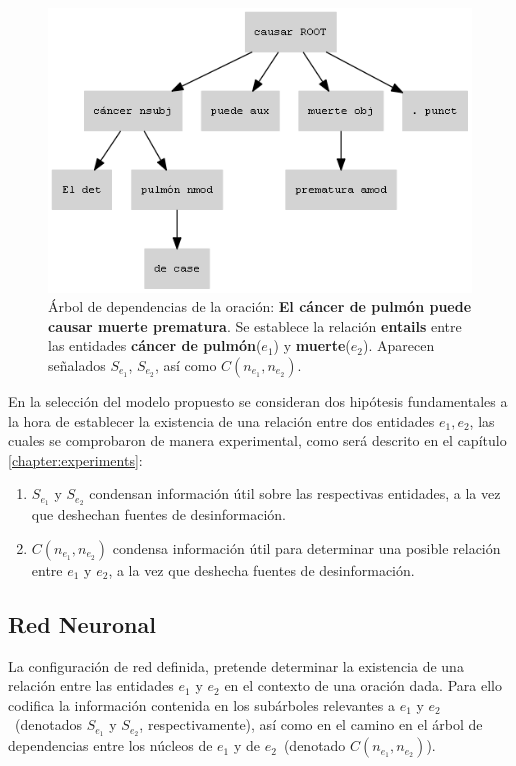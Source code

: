 \begin{figure}[h!]
	\centering
	\includegraphics[width=0.7\linewidth]{Graphics/dep_tree_ex.png}
	\caption{Árbol de dependencias de la oración: \textbf{El cáncer de pulmón puede causar muerte prematura}. Se establece la relación \textbf{entails} entre las entidades \textbf{cáncer de pulmón}($e_1$) y \textbf{muerte}($e_2$). Aparecen señalados $S_{e_1}$, $S_{e_2}$, así como $C(n_{e_1}, n_{e_2})$.}\label{fig:dep_tree_ex}
\end{figure}

En la selección del modelo propuesto se consideran dos hipótesis fundamentales a la hora de establecer la existencia de una relación entre dos entidades $e_1,e_2$, las cuales se comprobaron de manera experimental, como será descrito en el capítulo \ref{chapter:experiments}:

\begin{enumerate}
	\item $S_{e_1}$ y $S_{e_2}$ condensan información útil sobre las respectivas entidades, a la vez que deshechan fuentes de desinformación.
	
	\item $C(n_{e_1}, n_{e_2})$ condensa información útil para determinar una posible relación entre $e_1$ y $e_2$, a la vez que deshecha fuentes de desinformación.
\end{enumerate}


\subsection{Red Neuronal}

La configuración de red definida, pretende determinar la existencia de una relación entre las entidades $e_1$ y $e_2$ en el contexto de una oración dada. Para ello codifica la información contenida en los subárboles relevantes a $e_1$ y $e_2$~(denotados $S_{e_1}$ y $S_{e_2}$, respectivamente), así como en el camino en el árbol de dependencias entre los núcleos de $e_1$ y de $e_2$~(denotado $C(n_{e_1}, n_{e_2})$).


